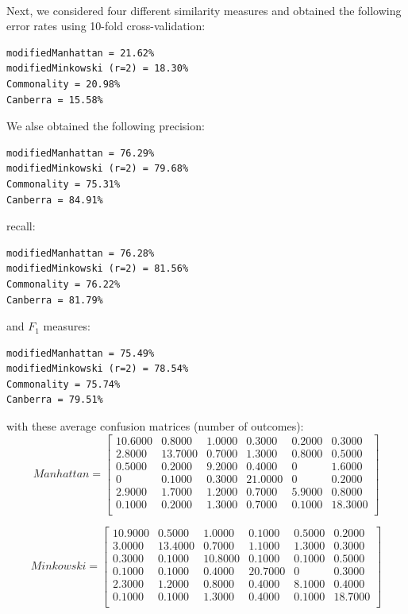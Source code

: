 \documentclass[a4paper,12pt,oneside,final]{report}
\begin{document}
\paragraph{}
Next, we considered four different similarity measures and obtained the following error rates using 10-fold cross-validation:
\begin{verbatim}
modifiedManhattan = 21.62%
modifiedMinkowski (r=2) = 18.30%
Commonality = 20.98%
Canberra = 15.58%
\end{verbatim}
We alse obtained the following precision:
\begin{verbatim}
modifiedManhattan = 76.29%
modifiedMinkowski (r=2) = 79.68%
Commonality = 75.31%
Canberra = 84.91%
\end{verbatim}
recall:
\begin{verbatim}
modifiedManhattan = 76.28%
modifiedMinkowski (r=2) = 81.56%
Commonality = 76.22%
Canberra = 81.79%
\end{verbatim}
and $F_1$ measures:
\begin{verbatim}
modifiedManhattan = 75.49%
modifiedMinkowski (r=2) = 78.54%
Commonality = 75.74%
Canberra = 79.51%
\end{verbatim}
with these average confusion matrices (number of outcomes):
\[
Manhattan = \left[\begin{array}{cccccc}
   10.6000 &   0.8000 &   1.0000 &   0.3000 &   0.2000 &   0.3000\\
    2.8000 &  13.7000 &   0.7000 &   1.3000 &   0.8000 &   0.5000\\
    0.5000 &   0.2000 &   9.2000 &   0.4000 &        0 &   1.6000\\
         0 &   0.1000 &   0.3000 &  21.0000 &        0 &   0.2000\\
    2.9000 &   1.7000 &   1.2000 &   0.7000 &   5.9000 &   0.8000\\
    0.1000 &   0.2000 &   1.3000 &   0.7000 &   0.1000 &  18.3000\\
\end{array}
\right]
\]

\[
Minkowski = \left[\begin{array}{cccccc}
   10.9000 &   0.5000 &   1.0000 &   0.1000 &   0.5000 &   0.2000\\
    3.0000 &  13.4000 &   0.7000 &   1.1000 &   1.3000 &   0.3000\\
    0.3000 &   0.1000 &  10.8000 &   0.1000 &   0.1000 &   0.5000\\
    0.1000 &   0.1000 &   0.4000 &  20.7000 &        0 &   0.3000\\
    2.3000 &   1.2000 &   0.8000 &   0.4000 &   8.1000 &   0.4000\\
    0.1000 &   0.1000 &   1.3000 &   0.4000 &   0.1000 &  18.7000\\
\end{array}
\right]
\]
\end{document}
